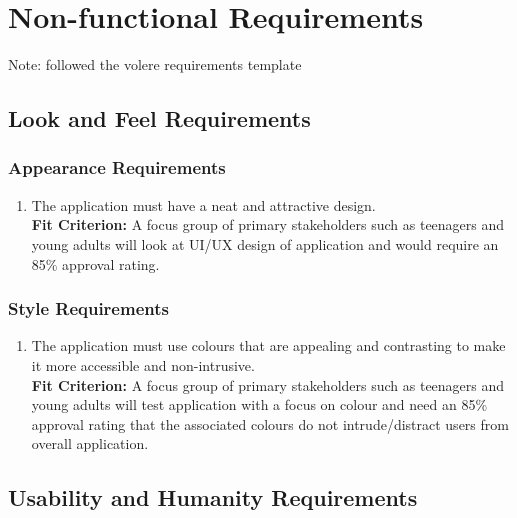 \documentclass[12pt,letterpaper]{article}
\begin{document}
\section{Non-functional Requirements}
\noindent Note: followed the volere requirements template

\subsection{Look and Feel Requirements}
\subsubsection{Appearance Requirements}
\begin{enumerate}[{LF}1.] 
	\item The application must have a neat and attractive design.\\
	{\textbf{Fit Criterion:} A focus group of primary stakeholders such as teenagers and young adults will look at UI/UX design of application and would require an 85\% approval rating.}
\end{enumerate}

\subsubsection{Style Requirements}
\begin{enumerate}[resume*]  
	\item The application must use colours that are appealing and contrasting to make it more accessible and non-intrusive.\\
	{\textbf{Fit Criterion:} A focus group of primary stakeholders such as teenagers and young adults will test application with a focus on colour and need an 85\% approval rating that the associated colours do not intrude/distract users from overall application.}
\end{enumerate}

\subsection{Usability and Humanity Requirements}
\end{document}
